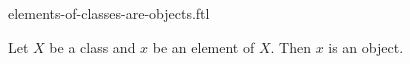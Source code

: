 \documentclass{stex}
\begin{document}
\begin{smodule}{elements-of-classes-are-objects.ftl}
  \begin{forthel}
    \begin{lemma}
      Let $X$ be a class and $x$ be an element of $X$.
      Then $x$ is an object.
    \end{lemma}
  \end{forthel}
\end{smodule}
\end{document}

